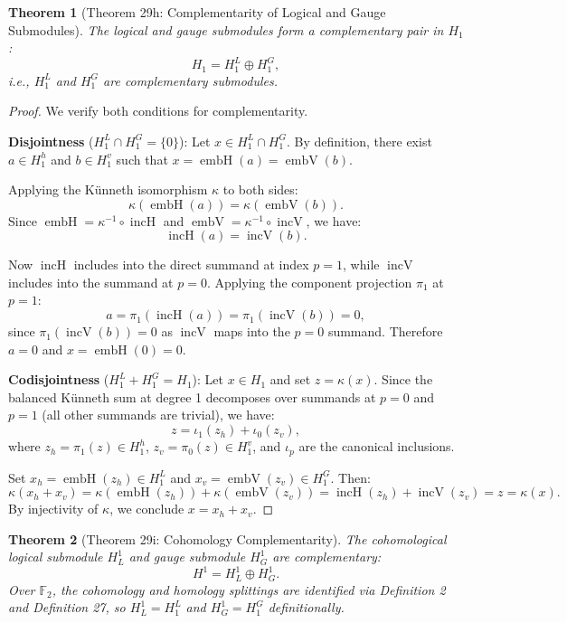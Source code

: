 \documentclass[11pt]{article}
\theoremstyle{plain}
\newtheorem*{theorem}{Theorem}
\theoremstyle{definition}
\theoremstyle{remark}
\begin{document}
\begin{theorem}[Theorem 29h: Complementarity of Logical and Gauge Submodules]
The logical and gauge submodules form a complementary pair in $H_1$:
\[
  H_1 = H_1^L \oplus H_1^G,
\]
i.e., $H_1^L$ and $H_1^G$ are complementary submodules.
\end{theorem}

\begin{proof}
We verify both conditions for complementarity.

\textbf{Disjointness} ($H_1^L \cap H_1^G = \{0\}$): Let $x \in H_1^L \cap H_1^G$. By definition, there exist $a \in H_1^h$ and $b \in H_1^v$ such that $x = \operatorname{embH}(a) = \operatorname{embV}(b)$.

Applying the Künneth isomorphism $\kappa$ to both sides:
\[
  \kappa(\operatorname{embH}(a)) = \kappa(\operatorname{embV}(b)).
\]
Since $\operatorname{embH} = \kappa^{-1} \circ \operatorname{incH}$ and $\operatorname{embV} = \kappa^{-1} \circ \operatorname{incV}$, we have:
\[
  \operatorname{incH}(a) = \operatorname{incV}(b).
\]

Now $\operatorname{incH}$ includes into the direct summand at index $p = 1$, while $\operatorname{incV}$ includes into the summand at $p = 0$. Applying the component projection $\pi_1$ at $p = 1$:
\[
  a = \pi_1(\operatorname{incH}(a)) = \pi_1(\operatorname{incV}(b)) = 0,
\]
since $\pi_1(\operatorname{incV}(b)) = 0$ as $\operatorname{incV}$ maps into the $p = 0$ summand. Therefore $a = 0$ and $x = \operatorname{embH}(0) = 0$.

\textbf{Codisjointness} ($H_1^L + H_1^G = H_1$): Let $x \in H_1$ and set $z = \kappa(x)$. Since the balanced Künneth sum at degree 1 decomposes over summands at $p = 0$ and $p = 1$ (all other summands are trivial), we have:
\[
  z = \iota_1(z_h) + \iota_0(z_v),
\]
where $z_h = \pi_1(z) \in H_1^h$, $z_v = \pi_0(z) \in H_1^v$, and $\iota_p$ are the canonical inclusions.

Set $x_h = \operatorname{embH}(z_h) \in H_1^L$ and $x_v = \operatorname{embV}(z_v) \in H_1^G$. Then:
\[
  \kappa(x_h + x_v) = \kappa(\operatorname{embH}(z_h)) + \kappa(\operatorname{embV}(z_v)) = \operatorname{incH}(z_h) + \operatorname{incV}(z_v) = z = \kappa(x).
\]
By injectivity of $\kappa$, we conclude $x = x_h + x_v$.
\end{proof}

\begin{theorem}[Theorem 29i: Cohomology Complementarity]
The cohomological logical submodule $H^1_L$ and gauge submodule $H^1_G$ are complementary:
\[
  H^1 = H^1_L \oplus H^1_G.
\]
Over $\mathbb{F}_2$, the cohomology and homology splittings are identified via Definition 2 and Definition 27, so $H^1_L = H_1^L$ and $H^1_G = H_1^G$ definitionally.
\end{theorem}
\end{document}
